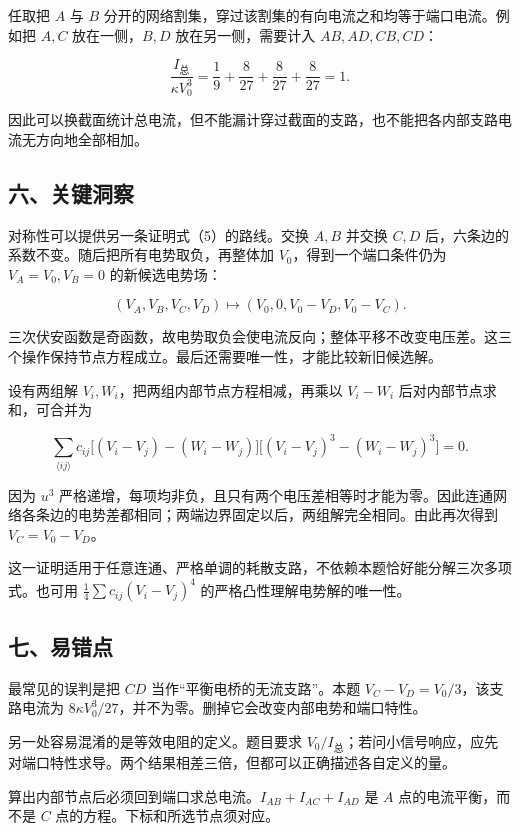 \documentclass[12pt,a4paper,fontset=fandol]{ctexart}
\begin{document}
任取把 \(A\) 与 \(B\)
分开的网络割集，穿过该割集的有向电流之和均等于端口电流。例如把 \(A,C\)
放在一侧，\(B,D\) 放在另一侧，需要计入 \(AB,AD,CB,CD\)：

\[
\frac{I_{\text{总}}}{\kappa V_0^3}
=\frac19+\frac8{27}+\frac8{27}+\frac8{27}=1.
\]

因此可以换截面统计总电流，但不能漏计穿过截面的支路，也不能把各内部支路电流无方向地全部相加。

\subsection{六、关键洞察}\label{ux516dux5173ux952eux6d1eux5bdf}

对称性可以提供另一条证明式（5）的路线。交换 \(A,B\) 并交换 \(C,D\)
后，六条边的系数不变。随后把所有电势取负，再整体加
\(V_0\)，得到一个端口条件仍为 \(V_A=V_0,V_B=0\) 的新候选电势场：

\[
(V_A,V_B,V_C,V_D)
\longmapsto(V_0,0,V_0-V_D,V_0-V_C).
\]

三次伏安函数是奇函数，故电势取负会使电流反向；整体平移不改变电压差。这三个操作保持节点方程成立。最后还需要唯一性，才能比较新旧候选解。

设有两组解 \(V_i,W_i\)，把两组内部节点方程相减，再乘以 \(V_i-W_i\)
后对内部节点求和，可合并为

\[
\sum_{\langle ij\rangle}
c_{ij}\big[(V_i-V_j)-(W_i-W_j)\big]
\big[(V_i-V_j)^3-(W_i-W_j)^3\big]=0.
\]

因为 \(u^3\)
严格递增，每项均非负，且只有两个电压差相等时才能为零。因此连通网络各条边的电势差都相同；两端边界固定以后，两组解完全相同。由此再次得到
\(V_C=V_0-V_D\)。

这一证明适用于任意连通、严格单调的耗散支路，不依赖本题恰好能分解三次多项式。也可用
\(\frac14\sum c_{ij}(V_i-V_j)^4\) 的严格凸性理解电势解的唯一性。

\subsection{七、易错点}\label{ux4e03ux6613ux9519ux70b9}

最常见的误判是把 \(CD\) 当作``平衡电桥的无流支路''。本题
\(V_C-V_D=V_0/3\)，该支路电流为
\(8\kappa V_0^3/27\)，并不为零。删掉它会改变内部电势和端口特性。

另一处容易混淆的是等效电阻的定义。题目要求
\(V_0/I_{\text{总}}\)；若问小信号响应，应先对端口特性求导。两个结果相差三倍，但都可以正确描述各自定义的量。

算出内部节点后必须回到端口求总电流。\(I_{AB}+I_{AC}+I_{AD}\) 是 \(A\)
点的电流平衡，而不是 \(C\) 点的方程。下标和所选节点须对应。
\end{document}
